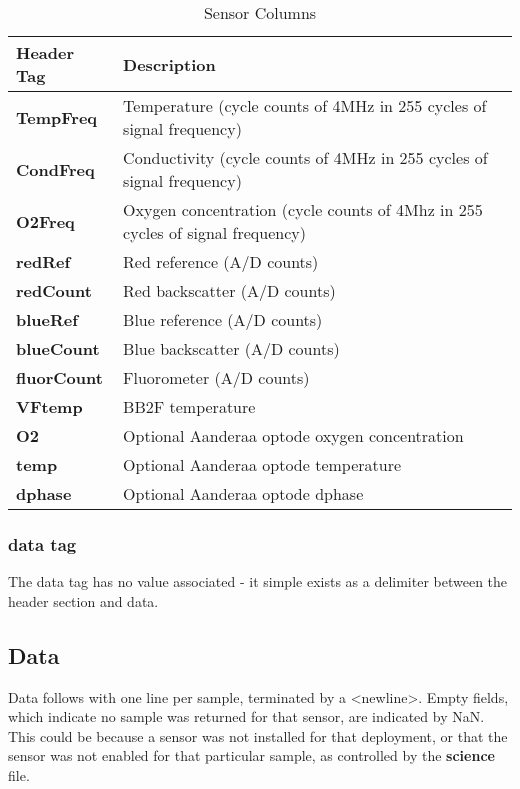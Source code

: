 \documentclass[12pt,english,twoside]{book}
\providecommand{\tabularnewline}{\\}
\begin{document}
%
\begin{table}
\begin{centering}\begin{tabular}{|l|p{4.5in}|}
\hline 
\textbf{Header Tag} &
\textbf{Description} \tabularnewline
\hline 
\textbf{TempFreq} &
Temperature (cycle counts of 4MHz in 255 cycles of signal frequency) \tabularnewline
\hline 
\textbf{CondFreq} &
Conductivity (cycle counts of 4MHz in 255 cycles of signal frequency) \tabularnewline
\hline 
\textbf{O2Freq} &
Oxygen concentration (cycle counts of 4Mhz in 255 cycles of signal
frequency)\tabularnewline
\hline 
\textbf{redRef} &
Red reference (A/D counts)\tabularnewline
\hline 
\textbf{redCount} &
Red backscatter (A/D counts)\tabularnewline
\hline 
\textbf{blueRef} &
Blue reference (A/D counts)\tabularnewline
\hline 
\textbf{blueCount} &
Blue backscatter (A/D counts)\tabularnewline
\hline 
\textbf{fluorCount} &
Fluorometer (A/D counts)\tabularnewline
\hline 
\textbf{VFtemp} &
BB2F temperature\tabularnewline
\hline 
\textbf{O2} &
Optional Aanderaa optode oxygen concentration\tabularnewline
\hline 
\textbf{temp} &
Optional Aanderaa optode temperature\tabularnewline
\hline 
\textbf{dphase} &
Optional Aanderaa optode dphase\tabularnewline
\hline
\end{tabular}\par\end{centering}


\caption{Sensor Columns}

\label{SensorColumns} 
\end{table}



\subsubsection{data tag}

The data tag has no value associated - it simple exists as a delimiter
between the header section and data.


\subsection{Data}

Data follows with one line per sample, terminated by a <newline>.
Empty fields, which indicate no sample was returned for that sensor,
are indicated by NaN. This could be because a sensor was not installed
for that deployment, or that the sensor was not enabled for that particular
sample, as controlled by the \textbf{science} file.
\end{document}
